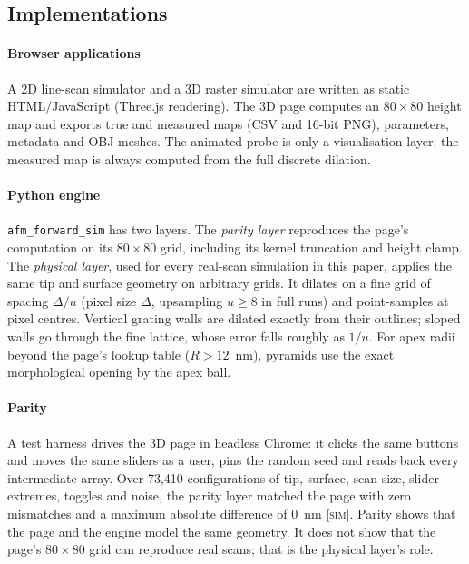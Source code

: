 \documentclass[preprint,12pt]{elsarticle}
\newcommand{\tags}{\textsc{[sim]}}
\begin{document}
\subsection{Implementations}

\paragraph{Browser applications} A 2D line-scan simulator and a 3D raster simulator are written as
static HTML/JavaScript (Three.js rendering). The 3D page computes an $80\times80$ height map and
exports true and measured maps (CSV and 16-bit PNG), parameters, metadata and OBJ meshes. The
animated probe is only a visualisation layer: the measured map is always computed from the full
discrete dilation.

\paragraph{Python engine} \texttt{afm\_forward\_sim} has two layers. The \emph{parity layer}
reproduces the page's computation on its $80\times80$ grid, including its kernel truncation and
height clamp. The \emph{physical layer}, used for every real-scan simulation in this paper, applies
the same tip and surface geometry on arbitrary grids. It dilates on a fine grid of spacing
$\Delta/u$ (pixel size $\Delta$, upsampling $u\ge 8$ in full runs) and point-samples at pixel
centres. Vertical grating walls are dilated exactly from their outlines; sloped walls go through
the fine lattice, whose error falls roughly as $1/u$. For apex radii beyond the page's lookup
table ($R>12$~nm), pyramids use the exact morphological opening by the apex ball.

\paragraph{Parity} A test harness drives the 3D page in headless Chrome: it clicks the same
buttons and moves the same sliders as a user, pins the random seed and reads back every
intermediate array. Over 73,410 configurations of tip, surface, scan size, slider extremes,
toggles and noise, the parity layer matched the page with zero mismatches and a maximum absolute
difference of 0~nm \tags. Parity shows that the page and the engine model the same geometry. It
does not show that the page's $80\times80$ grid can reproduce real scans; that is the physical
layer's role.

\end{document}
